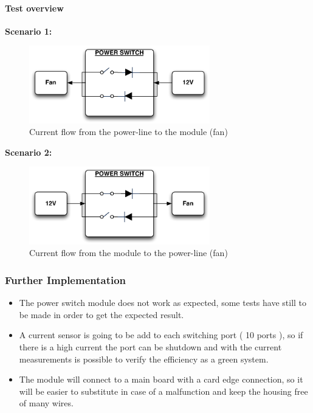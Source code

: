 \paragraph{Test overview}
\textbf{Scenario 1:}
\begin{figure}[H]
	\begin{centering}
		\includegraphics[width=0.7\textwidth,page=1]{images/scenario1.pdf}
		\caption{Current flow from the power-line to the module (fan)}
	\end{centering}
\end{figure}
\textbf{Scenario 2:}
\begin{figure}[H]
	\begin{centering}
		\includegraphics[width=0.7\textwidth,page=1]{images/scenario2.pdf}
		\caption{Current flow from the module to the power-line (fan)}
	\end{centering}
\end{figure}
\subsubsection{Further Implementation}
\begin{itemize}
	\item The power switch module does not work as expected, some tests have still to be made in order to get the expected result.
	\item A current sensor is going to be add to each switching port ( 10 ports ), so if there is a high current the port can be shutdown and with the current measurements is possible to verify the efficiency as a green system.
	\item The module will connect to a main board with a card edge connection, so it will be easier to substitute in case of a malfunction and keep the housing free of many wires.
\end{itemize}


